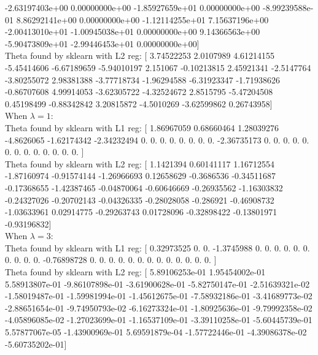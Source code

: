 \documentclass[12pt]{article}
\begin{document}
  -2.63197403e+00   0.00000000e+00  -1.85927659e+01   0.00000000e+00
  -8.99239588e-01   8.86292141e+00   0.00000000e+00  -1.12114255e+01
   7.15637196e+00  -2.00413010e+01  -1.00945038e+01   0.00000000e+00
   9.14366563e+00  -5.90473809e+01  -2.99446453e+01   0.00000000e+00]\\
Theta found by sklearn with L2 reg:  [ 3.74522253  2.0107989   4.61214155 -5.45414606 -6.67189659 -5.94010197
  2.151067   -0.10213815  2.45921341 -2.5147764  -3.80255072  2.98381388
 -3.77718734 -1.96294588 -6.31923347 -1.71938626 -0.86707608  4.99914053
 -3.62305722 -4.32524672  2.8515795  -5.47204508  0.45198499 -0.88342842
  3.20815872 -4.5010269  -3.62599862  0.26743958]\\[0.5cm]
When $\lambda = 1 $:\\
Theta found by sklearn with L1 reg:  [ 1.86967059  0.68660464  1.28039276 -4.8626065  -1.62174342 -2.34232494
  0.          0.          0.          0.          0.          0.          0.
  0.         -2.36735173  0.          0.          0.          0.          0.
  0.          0.          0.          0.          0.          0.          0.
  0.        ]\\
Theta found by sklearn with L2 reg:  [ 1.1421394   0.60141117  1.16712554 -1.87160974 -0.91574144 -1.26966693
  0.12658629 -0.3686536  -0.34511687 -0.17368655 -1.42387465 -0.04870064
 -0.60646669 -0.26935562 -1.16303832 -0.24327026 -0.20702143 -0.04326335
 -0.28028058 -0.286921   -0.46908732 -1.03633961  0.02914775 -0.29263743
  0.01728096 -0.32898422 -0.13801971 -0.93196832]\\[0.5cm]
When $\lambda = 3 $:\\
Theta found by sklearn with L1 reg:  [ 0.32973525  0.          0.         -1.3745988   0.          0.          0.
  0.          0.          0.          0.          0.          0.          0.
 -0.76898728  0.          0.          0.          0.          0.          0.
  0.          0.          0.          0.          0.          0.          0.        ]\\
 Theta found by sklearn with L2 reg:  [  5.89106253e-01   1.95454002e-01   5.58913807e-01  -9.86107898e-01
  -3.61900628e-01  -5.82750147e-01  -2.51639321e-02  -1.58019487e-01
  -1.59981994e-01  -1.45612675e-01  -7.58932186e-01  -3.41689773e-02
  -2.88651654e-01  -9.74950793e-02  -6.16273324e-01  -1.80925636e-01
  -9.79992358e-02  -4.05896085e-02  -1.27023699e-01  -1.16537109e-01
  -3.39110258e-01  -5.60445739e-01   5.57877067e-05  -1.43900969e-01
   5.69591879e-04  -1.57722446e-01  -4.39086378e-02  -5.60735202e-01]\\[0.5cm]
   
\end{document}
